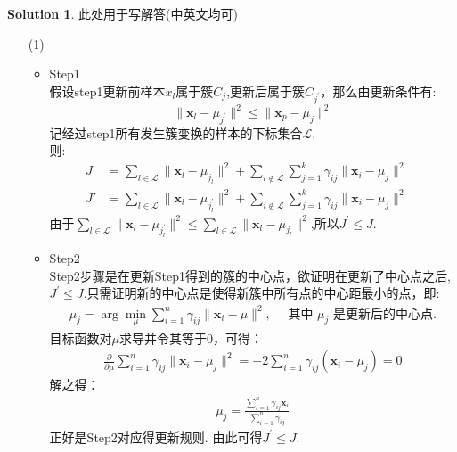 \documentclass[a4paper,UTF8]{article}
\numberwithin{equation}{section}
\numberwithin{equation}{section}
\theoremstyle{definition}
\newtheorem*{solution}{Solution}
\begin{document}
\begin{solution}
    此处用于写解答(中英文均可)
    \begin{enumerate}
        \item [(1)]
        \begin{itemize}
            \item Step1 \\
            假设step1更新前样本$x_l$属于簇$C_j$,更新后属于簇$C_{j^{\prime}}$，那么由更新条件有: $$\|\mathbf{x}_l-\mu_{j^\prime}\|^2\leq \|\mathbf{x}_p-\mu_{j}\|^2$$
            记经过step1所有发生簇变换的样本的下标集合$\mathcal{L}$. \\
            则:
            \begin{align*}
                J &= \sum\limits_{l\in \mathcal{L}}\|\mathbf{x}_{l}-\mu_{j_{l}}\|^2 + \sum_{i\not\in \mathcal{L}}\sum_{j=1}^k\gamma_{ij}\|\mathbf{x}_i-\mu_j\|^2  \quad \\
                J' &= \sum\limits_{l\in \mathcal{L}}\|\mathbf{x}_{l}-\mu_{j^{\prime}_{l}}\|^2 + \sum_{i\not\in \mathcal{L}}\sum_{j=1}^k\gamma_{ij}\|\mathbf{x}_i-\mu_j\|^2     \quad 
            \end{align*}
            由于$\sum\limits_{l\in \mathcal{L}}\|\mathbf{x}_{l}-\mu_{j^{\prime}_{l}}\|^2 \leq \sum\limits_{l\in \mathcal{L}}\|\mathbf{x}_{l}-\mu_{j_{l}}\|^2$,所以$J^{\prime} \leq J$.
            \item Step2 \\
            Step2步骤是在更新Step1得到的簇的中心点，欲证明在更新了中心点之后,$J^{\prime}\leq J$,只需证明新的中心点是使得新簇中所有点的中心距最小的点，即:
            \begin{align*}
                \mu_j = \arg \min_{\mu}\sum_{i=1}^n \gamma_{ij}\|\mathbf{x}_i-\mu\|^2, \quad \text{ 其中 } \mu_j \text{ 是更新后的中心点.}
            \end{align*} 
            目标函数对$\mu$求导并令其等于0，可得：
            \begin{align*}
                \frac{\partial}{\partial \mu} \sum_{i=1}^n \gamma_{ij}\|\mathbf x_i - \mu_j\|^2 = -2 \sum_{i=1}^n \gamma_{ij} (\mathbf x_i - \mu_j) = 0
            \end{align*} 
            解之得：
            \begin{align*}
                \mu_j = \frac{\sum_{i=1}^n \gamma_{ij}\mathbf x_i}{\sum_{i=1}^n \gamma_{ij}}
            \end{align*}
            正好是Step2对应得更新规则. 由此可得$J^{\prime}\leq J$.
        \end{itemize}

\end{enumerate}
\end{solution}
\end{document}
